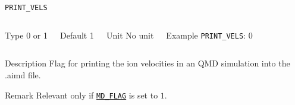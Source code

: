 \begin{frame}[allowframebreaks]{\texttt{PRINT\_VELS}} \label{PRINT_VELS}
\vspace*{-12pt}
\begin{columns}
\begin{block}{Type}
0 or 1
\end{block}

\begin{block}{Default}
1
\end{block}

\begin{block}{Unit}
No unit
\end{block}

\begin{block}{Example}
\texttt{PRINT\_VELS}: 0
\end{block}
\end{columns}

\begin{block}{Description}
Flag for printing the ion velocities in an QMD simulation into the .aimd file. 
\end{block}

\begin{block}{Remark}
Relevant only if \hyperlink{MD_FLAG}{\texttt{MD\_FLAG}} is set to $1$.
\end{block}

\end{frame}




